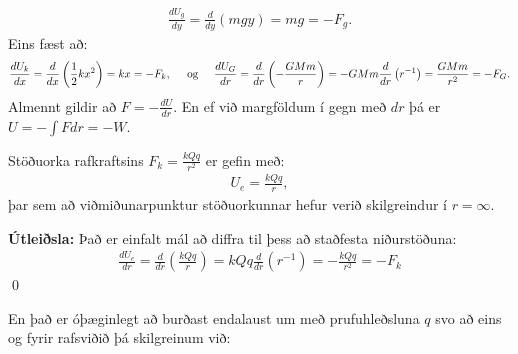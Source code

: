 \ifdefined \wholebook \else\documentclass[oneside]{book}\usepackage{EdlBook}\graphicspath{{figures/}}
\begin{document}
\begin{align*}
    \frac{dU_g}{dy} = \frac{d}{dy}\left( mgy\right) = mg = -F_g.
\end{align*}
Eins fæst að:
\begin{align*}
    \frac{dU_k}{dx} = \frac{d}{dx}\left( \frac{1}{2}kx^2 \right) = kx = -F_k, \hspace{0.5cm} \text{og} \hspace{0.5cm} \frac{dU_G}{dr} = \frac{d}{dr}\left( -\frac{GMm}{r} \right) = -GMm \frac{d}{dr}\left( r^{-1} \right) = \frac{GMm}{r^2} = -F_G.
\end{align*}
Almennt gildir að $F = -\frac{dU}{dr}$. En ef við margföldum í gegn með $dr$ þá er $U = -\int F dr = -W$.

\newpage

\begin{tcolorbox}
\begin{theorem}
Stöðuorka rafkraftsins $F_k = \frac{kQq}{r^2}$ er gefin með:
\begin{align*}
    U_e = \frac{kQq}{r},
\end{align*}
þar sem að viðmiðunarpunktur stöðuorkunnar hefur verið skilgreindur í $r = \infty$.
\end{theorem}
\end{tcolorbox}

\textbf{Útleiðsla:} Það er einfalt mál að diffra til þess að staðfesta niðurstöðuna:
\begin{align*}
    \frac{dU_e}{dr} = \frac{d}{dr}\left( \frac{kQq}{r} \right) = kQq\frac{d}{dr}\left( r^{-1} \right) = -\frac{kQq}{r^2} = -F_k
\end{align*}
\qed

En það er óþæginlegt að burðast endalaust um með prufuhleðsluna $q$ svo að eins og fyrir rafsviðið þá skilgreinum við:
\end{document}
